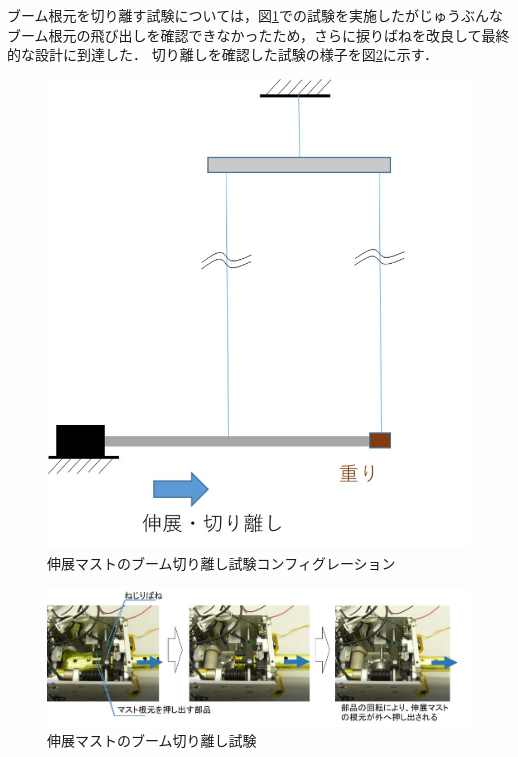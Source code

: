ブーム根元を切り離す試験については，図\ref{fig3-9-2-1-6}での試験を実施したがじゅうぶんなブーム根元の飛び出しを確認できなかったため，さらに捩りばねを改良して最終的な設計に到達した．
切り離しを確認した試験の様子を図\ref{fig3-9-2-1-7}に示す．
\begin{figure}[H]
	\centering
	\includegraphics[width=.4\textwidth]{03/fig/3-9-2-1-6.jpg}
	\caption{伸展マストのブーム切り離し試験コンフィグレーション}
	\label{fig3-9-2-1-6}
\end{figure}
\begin{figure}[H]
	\centering
	\includegraphics[width=.8\textwidth]{03/fig/3-9-2-1-7.jpg}
	\caption{伸展マストのブーム切り離し試験}
	\label{fig3-9-2-1-7}
\end{figure}